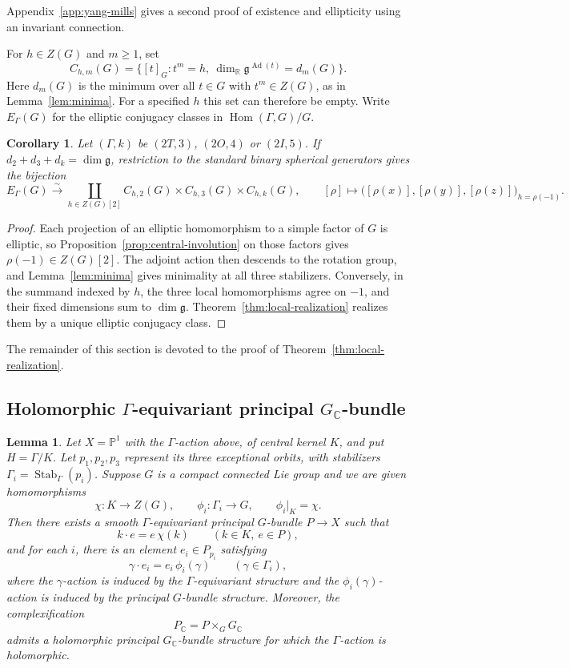 \documentclass[11pt,a4paper,reqno]{amsart}
\theoremstyle{plain}
\newtheorem{lemma}[theorem]{Lemma}
\newtheorem{corollary}[theorem]{Corollary}
\theoremstyle{definition}
\theoremstyle{remark}
\numberwithin{equation}{section}
\DeclareMathOperator{\Hom}{Hom}
\DeclareMathOperator{\Stab}{Stab}
\DeclareMathOperator{\Ad}{Ad}
\newcommand{\CC}{\mathbb C}
\newcommand{\RR}{\mathbb R}
\newcommand{\PP}{\mathbb P}
\newcommand{\fg}{\mathfrak g}
\begin{document}
Appendix~\ref{app:yang-mills} gives a second proof of existence and ellipticity using an invariant connection.

For $h\in Z(G)$ and $m\ge1$, set
\[
C_{h,m}(G)=\bigl\{[t]_G:t^m=h,\ \dim_{\RR}\fg^{\Ad(t)}=d_m(G)\bigr\}.
\]
Here $d_m(G)$ is the minimum over all $t\in G$ with $t^m\in Z(G)$, as in Lemma~\ref{lem:minima}. For a specified $h$ this set can therefore be empty. Write $E_\Gamma(G)$ for the elliptic conjugacy classes in $\Hom(\Gamma,G)/G$.

\begin{corollary}\label{cor:spherical-local}
Let $(\Gamma,k)$ be $(2T,3)$, $(2O,4)$ or $(2I,5)$. If $d_2+d_3+d_k=\dim\fg$, restriction to the standard binary spherical generators gives the bijection
\[
E_\Gamma(G)\xrightarrow{\sim}\coprod_{h\in Z(G)[2]} C_{h,2}(G)\times C_{h,3}(G)\times C_{h,k}(G),\qquad
[\rho]\longmapsto \bigl([\rho(x)],[\rho(y)],[\rho(z)]\bigr)_{h=\rho(-1)}.
\]
\end{corollary}

\begin{proof}
Each projection of an elliptic homomorphism to a simple factor of $G$ is elliptic, so Proposition~\ref{prop:central-involution} on those factors gives $\rho(-1)\in Z(G)[2]$. The adjoint action then descends to the rotation group, and Lemma~\ref{lem:minima} gives minimality at all three stabilizers. Conversely, in the summand indexed by $h$, the three local homomorphisms agree on $-1$, and their fixed dimensions sum to $\dim\fg$. Theorem~\ref{thm:local-realization} realizes them by a unique elliptic conjugacy class.
\end{proof}

The remainder of this section is devoted to the proof of Theorem~\ref{thm:local-realization}.

\subsection{Holomorphic \texorpdfstring{$\Gamma$}{Gamma}-equivariant principal \texorpdfstring{$G_{\CC}$}{GC}-bundle}

\begin{lemma}\label{lem:equivariant-bundle-construction} Let $X=\PP^1$ with the $\Gamma$-action above, of central kernel $K$, and put $H=\Gamma/K$. Let $p_1,p_2,p_3$ represent its three exceptional orbits, with stabilizers $\Gamma_i=\Stab_\Gamma(p_i)$. Suppose $G$ is a compact connected Lie group and we are given homomorphisms
\[
\chi\colon K\longrightarrow Z(G),
\qquad
\phi_i\colon\Gamma_i\longrightarrow G,
\qquad
\phi_i|_K=\chi.
\]
Then there exists a smooth $\Gamma$-equivariant principal
$G$-bundle $P\to X$ such that
\[
k\cdot e=e\,\chi(k)
\qquad(k\in K,\ e\in P),
\]
and for each $i$, there is an element $e_i\in P_{p_i}$ satisfying
\[
\gamma\cdot e_i=e_i\,\phi_i(\gamma)
\qquad(\gamma\in\Gamma_i),
\]
where the $\gamma$-action is induced by the $\Gamma$-equivariant structure and the $\phi_i(\gamma)$-action is induced by the principal $G$-bundle structure. Moreover, the complexification
\[
P_{\CC}=P\times_G G_{\CC}
\]
admits a holomorphic principal $G_{\CC}$-bundle structure for which the $\Gamma$-action is holomorphic.
\end{lemma}
\end{document}
